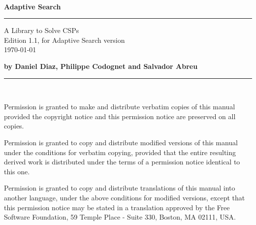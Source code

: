 \newlength{\saveparskip}
\setlength{\saveparskip}{\parskip}

\pagestyle{empty}
\setlength{\parskip}{0pt}
~

\vspace{4cm}
{\huge\bf Adaptive Search}

\vspace{3mm}

\rule[2mm]{\linewidth}{2mm}

\begin{flushright}

{\Large
A Library to Solve CSPs\\
Edition 1.1, for Adaptive Search version \\

\today
}

\end{flushright}


\vspace{10cm}

{\large\bf by Daniel Diaz, Philippe Codognet and Salvador Abreu}

\rule[2mm]{\linewidth}{1mm}

\newpage
~

\vspace{10cm}

\setlength{\parskip}{\saveparskip}



Permission is granted to make and distribute verbatim copies of this manual
provided the copyright notice and this permission notice are preserved on all
copies.

Permission is granted to copy and distribute modified versions of this manual
under the conditions for verbatim copying, provided that the entire resulting
derived work is distributed under the terms of a permission notice identical
to this one.

Permission is granted to copy and distribute translations of this manual into
another language, under the above conditions for modified versions, except
that this permission notice may be stated in a translation approved by the
Free Software Foundation, 59 Temple Place - Suite 330, Boston, MA 02111, USA.


\newpage
\pagestyle{fancy}

\setcounter{page}{1}


